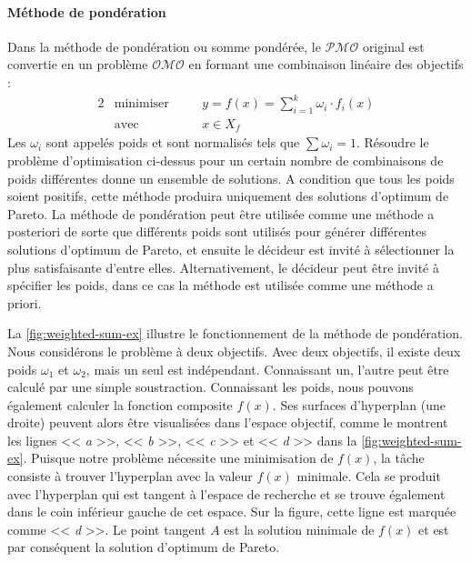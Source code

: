 \paragraph{Méthode de pondération}
Dans la méthode de pondération ou somme pondérée, le $\mathcal{PMO}$ original est convertie en un problème $\mathcal{OMO}$ en formant une combinaison linéaire des objectifs \cite{Gass55,Zadeh63} :
\begin{alignat}{2}
& \text{minimiser} \quad && y = f(x) = \sum_{i=1}^{k}\omega_i \cdot f_i(x) \nonumber \\
& \text{avec}   \quad && x \in X_f
\end{alignat}
Les $\omega_i$ sont appelés poids et sont normalisés tels que $\sum \omega_i = 1$. Résoudre le problème d'optimisation ci-dessus pour un certain nombre de combinaisons de poids différentes donne un ensemble de solutions. A condition que tous les poids soient positifs, cette méthode produira uniquement des solutions d'optimum de Pareto.
La méthode de pondération peut être utilisée comme une méthode a posteriori de sorte que différents poids sont utilisés pour générer différentes solutions d'optimum de Pareto, et ensuite le décideur est invité à sélectionner la plus satisfaisante d'entre elles. Alternativement, le décideur peut être invité à spécifier les poids, dans ce cas la méthode est utilisée comme une méthode a priori.

\begin{example}
 La \ref{fig:weighted-sum-ex} illustre le fonctionnement de la méthode de pondération. Nous considérons le problème à deux objectifs. Avec deux objectifs, il existe deux poids $\omega_1$ et $\omega_2$, mais un seul est indépendant. Connaissant un, l'autre peut être calculé par une simple soustraction. Connaissant les poids, nous pouvons également calculer la fonction composite $f(x)$. Ses surfaces d'hyperplan (une droite) peuvent alors être visualisées dans l'espace objectif, comme le montrent les lignes << \textit{a} >>, << \textit{b} >>, << \textit{c} >> et << \textit{d} >> dans la \ref{fig:weighted-sum-ex}. Puisque notre problème nécessite une minimisation de $f(x)$, la tâche consiste à trouver l’hyperplan avec la valeur $f(x)$ minimale. Cela se produit avec l'hyperplan qui est tangent à l'espace de recherche et se trouve également dans le coin inférieur gauche de cet espace. Sur la figure, cette ligne est marquée comme << \textit{d} >>. Le point tangent $A$ est la solution minimale de $f(x)$ et est par conséquent la solution d'optimum de Pareto.
\end{example}

